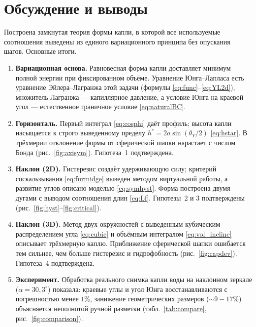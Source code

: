 \documentclass[11pt]{article}
\newcommand{\thY}{\theta_{Y}}
\theoremstyle{definition}
\begin{document}
\section{Обсуждение и выводы}
\label{sec:concl}
Построена замкнутая теория формы капли, в которой все используемые соотношения
выведены из единого вариационного принципа без опускания шагов. Основные итоги.

\begin{enumerate}[topsep=2pt,itemsep=2pt]
\item \textbf{Вариационная основа.} Равновесная форма капли доставляет минимум
полной энергии при фиксированном объёме. Уравнение Юнга--Лапласа есть уравнение
Эйлера--Лагранжа этой задачи (формулы \eqref{eq:func}--\eqref{eq:YL2d}), множитель
Лагранжа --- капиллярное давление, а условие Юнга на краевой угол ---
естественное граничное условие \eqref{eq:naturalBC}.

\item \textbf{Горизонталь.} Первый интеграл \eqref{eq:cosphi} даёт профиль; высота
капли насыщается к строго выведенному пределу $h^{*}=2a\sin(\thY/2)$
\eqref{eq:hstar}. В трёхмерии отклонение формы от сферической шапки нарастает с
числом Бонда (рис.~\ref{fig:axisym}). Гипотеза~1 подтверждена.

\item \textbf{Наклон (2D).} Гистерезис создаёт удерживающую силу; критерий
соскальзывания \eqref{eq:furmidge} выведен методом виртуальной работы, а развитие
углов описано моделью \eqref{eq:symhyst}. Форма построена двумя дугами с выводом
соотношения длин \eqref{eq:Lf}. Гипотезы~2 и 3 подтверждены
(рис.~\ref{fig:hyst}--\ref{fig:critical}).

\item \textbf{Наклон (3D).} Метод двух окружностей с выведенным кубическим
распределением угла \eqref{eq:cubic} и объёмным интегралом \eqref{eq:vol_incline}
описывает трёхмерную каплю. Приближение сферической шапки ошибается тем сильнее, чем
больше гистерезис и гидрофобность (рис.~\ref{fig:capdev}). Гипотеза~4 подтверждена.

\item \textbf{Эксперимент.} Обработка реального снимка капли воды на наклонном зеркале
($\alpha=30{,}3^{\circ}$) показала: краевые углы и угол Юнга восстанавливаются с
погрешностью менее $1\%$, занижение геометрических размеров (${\sim}9\!-\!17\%$)
объясняется неполнотой ручной разметки (табл.~\ref{tab:compare}, рис.~\ref{fig:comparison}).
\end{enumerate}
\end{document}
